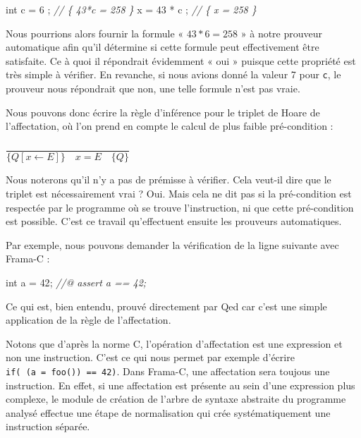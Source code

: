 \documentclass[12pt,francais,]{scrbook}
\newenvironment{Shaded}{}{}
\newcommand{\DataTypeTok}[1]{\textcolor[rgb]{0.56,0.13,0.00}{{#1}}}
\newcommand{\DecValTok}[1]{\textcolor[rgb]{0.25,0.63,0.44}{{#1}}}
\newcommand{\CommentTok}[1]{\textcolor[rgb]{0.38,0.63,0.69}{\textit{{#1}}}}
\newcommand{\NormalTok}[1]{{#1}}
\newenvironment{zdsblock}[1]{%
  \tcolorbox[beamer,%
    noparskip,breakable,
    colback=LightBlue,colframe=DarkBlue,%
    colbacklower=DarkBlue,%
    title=#1]
}{\endtcolorbox}
\begin{document}
\begin{footnotesize}\begin{Shaded}
\begin{Highlighting}[]
\DataTypeTok{int} \NormalTok{c = }\DecValTok{6} \NormalTok{;}
\CommentTok{// \{ 43*c = 258 \}}
\NormalTok{x = }\DecValTok{43} \NormalTok{* c ;}
\CommentTok{// \{ x = 258 \}}
\end{Highlighting}
\end{Shaded}\end{footnotesize}

Nous pourrions alors fournir la formule « \(43*6 = 258\) » à notre
prouveur automatique afin qu'il détermine si cette formule peut
effectivement être satisfaite. Ce à quoi il répondrait évidemment « oui
» puisque cette propriété est très simple à vérifier. En revanche, si
nous avions donné la valeur 7 pour \texttt{c}, le prouveur nous
répondrait que non, une telle formule n'est pas vraie.

Nous pouvons donc écrire la règle d'inférence pour le triplet de Hoare
de l'affectation, où l'on prend en compte le calcul de plus faible
pré-condition :

\begin{center}
\(\dfrac{}{\{Q[x \leftarrow E] \}\quad x = E \quad\{ Q \}}\)
\end{center}

Nous noterons qu'il n'y a pas de prémisse à vérifier. Cela veut-il dire
que le triplet est nécessairement vrai ? Oui. Mais cela ne dit pas si la
pré-condition est respectée par le programme où se trouve l'instruction,
ni que cette pré-condition est possible. C'est ce travail qu'effectuent
ensuite les prouveurs automatiques.

Par exemple, nous pouvons demander la vérification de la ligne suivante
avec Frama-C :

\begin{footnotesize}\begin{Shaded}
\begin{Highlighting}[]
\DataTypeTok{int} \NormalTok{a = }\DecValTok{42}\NormalTok{;}
\CommentTok{//@ assert a == 42;}
\end{Highlighting}
\end{Shaded}\end{footnotesize}

Ce qui est, bien entendu, prouvé directement par Qed car c'est une
simple application de la règle de l'affectation.

\begin{zdsblock}{Information}
  Notons que d'après la norme C,
  l'opération d'affectation est une expression et non une
  instruction. C'est ce qui nous permet par exemple d'écrire
  \texttt{if(\ (a\ =\ foo())\ ==\ 42)}. Dans Frama-C, une affectation sera
  toujous une instruction. En effet, si une affectation est
  présente au sein d'une expression plus complexe, le module de
  création de l'arbre de syntaxe abstraite du programme analysé
  effectue une étape de normalisation qui crée systématiquement
  une instruction séparée.
\end{zdsblock}
\end{document}
